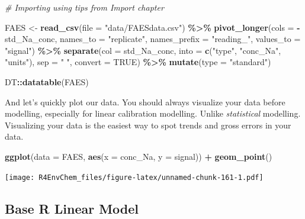 \documentclass[
]{book}
\newenvironment{Shaded}{\begin{snugshade}}{\end{snugshade}}
\newcommand{\AttributeTok}[1]{\textcolor[rgb]{0.13,0.29,0.53}{#1}}
\newcommand{\CommentTok}[1]{\textcolor[rgb]{0.56,0.35,0.01}{\textit{#1}}}
\newcommand{\ConstantTok}[1]{\textcolor[rgb]{0.56,0.35,0.01}{#1}}
\newcommand{\FunctionTok}[1]{\textcolor[rgb]{0.13,0.29,0.53}{\textbf{#1}}}
\newcommand{\NormalTok}[1]{#1}
\newcommand{\OtherTok}[1]{\textcolor[rgb]{0.56,0.35,0.01}{#1}}
\newcommand{\SpecialCharTok}[1]{\textcolor[rgb]{0.81,0.36,0.00}{\textbf{#1}}}
\newcommand{\StringTok}[1]{\textcolor[rgb]{0.31,0.60,0.02}{#1}}
\begin{document}
\begin{Shaded}
\begin{Highlighting}[]
\CommentTok{\# Importing using tips from Import chapter}

\NormalTok{FAES }\OtherTok{\textless{}{-}} \FunctionTok{read\_csv}\NormalTok{(}\AttributeTok{file =} \StringTok{"data/FAESdata.csv"}\NormalTok{) }\SpecialCharTok{\%\textgreater{}\%}
  \FunctionTok{pivot\_longer}\NormalTok{(}\AttributeTok{cols =} \SpecialCharTok{{-}}\NormalTok{std\_Na\_conc,}
               \AttributeTok{names\_to =} \StringTok{"replicate"}\NormalTok{, }
               \AttributeTok{names\_prefix =} \StringTok{"reading\_"}\NormalTok{,}
               \AttributeTok{values\_to =} \StringTok{"signal"}\NormalTok{) }\SpecialCharTok{\%\textgreater{}\%}
  \FunctionTok{separate}\NormalTok{(}\AttributeTok{col =}\NormalTok{ std\_Na\_conc,}
           \AttributeTok{into =} \FunctionTok{c}\NormalTok{(}\StringTok{"type"}\NormalTok{, }\StringTok{"conc\_Na"}\NormalTok{, }\StringTok{"units"}\NormalTok{),}
           \AttributeTok{sep =} \StringTok{" "}\NormalTok{,}
           \AttributeTok{convert =} \ConstantTok{TRUE}\NormalTok{) }\SpecialCharTok{\%\textgreater{}\%}
  \FunctionTok{mutate}\NormalTok{(}\AttributeTok{type =} \StringTok{"standard"}\NormalTok{)}

\NormalTok{DT}\SpecialCharTok{::}\FunctionTok{datatable}\NormalTok{(FAES)}
\end{Highlighting}
\end{Shaded}

And let's quickly plot our data. You should always visualize your data before modelling, especially for linear calibration modelling. Unlike \emph{statistical} modelling. Visualizing your data is the easiest way to spot trends and gross errors in your data.

\begin{Shaded}
\begin{Highlighting}[]
\FunctionTok{ggplot}\NormalTok{(}\AttributeTok{data =}\NormalTok{ FAES,}
       \FunctionTok{aes}\NormalTok{(}\AttributeTok{x =}\NormalTok{ conc\_Na, }
           \AttributeTok{y =}\NormalTok{ signal)) }\SpecialCharTok{+}
  \FunctionTok{geom\_point}\NormalTok{()}
\end{Highlighting}
\end{Shaded}

\texttt{[image: R4EnvChem\_files/figure-latex/unnamed-chunk-161-1.pdf]}

\hypertarget{base-r-linear-model}{%
\subsection{Base R Linear Model}\label{base-r-linear-model}}
\end{document}
